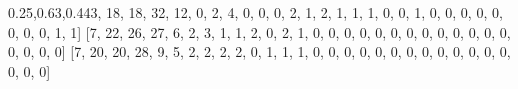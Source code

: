 \documentclass[
]{article}
\newenvironment{Shaded}{}{}
\newcommand{\DecValTok}[1]{\textcolor[rgb]{0.25,0.63,0.44}{#1}}
\newcommand{\NormalTok}[1]{#1}
\begin{document}
\begin{Shaded}
\begin{Highlighting}[]
\NormalTok{[}\DecValTok{3}\NormalTok{, }\DecValTok{18}\NormalTok{, }\DecValTok{18}\NormalTok{, }\DecValTok{32}\NormalTok{, }\DecValTok{12}\NormalTok{, }\DecValTok{0}\NormalTok{, }\DecValTok{2}\NormalTok{, }\DecValTok{4}\NormalTok{, }\DecValTok{0}\NormalTok{, }\DecValTok{0}\NormalTok{, }\DecValTok{0}\NormalTok{, }\DecValTok{2}\NormalTok{, }\DecValTok{1}\NormalTok{, }\DecValTok{2}\NormalTok{, }\DecValTok{1}\NormalTok{, }\DecValTok{1}\NormalTok{, }\DecValTok{1}\NormalTok{, }\DecValTok{0}\NormalTok{, }\DecValTok{0}\NormalTok{, }\DecValTok{1}\NormalTok{, }\DecValTok{0}\NormalTok{, }\DecValTok{0}\NormalTok{, }\DecValTok{0}\NormalTok{, }\DecValTok{0}\NormalTok{, }\DecValTok{0}\NormalTok{, }\DecValTok{0}\NormalTok{, }\DecValTok{0}\NormalTok{, }\DecValTok{0}\NormalTok{, }\DecValTok{1}\NormalTok{, }\DecValTok{1}\NormalTok{]}
\NormalTok{[}\DecValTok{7}\NormalTok{, }\DecValTok{22}\NormalTok{, }\DecValTok{26}\NormalTok{, }\DecValTok{27}\NormalTok{, }\DecValTok{6}\NormalTok{, }\DecValTok{2}\NormalTok{, }\DecValTok{3}\NormalTok{, }\DecValTok{1}\NormalTok{, }\DecValTok{1}\NormalTok{, }\DecValTok{2}\NormalTok{, }\DecValTok{0}\NormalTok{, }\DecValTok{2}\NormalTok{, }\DecValTok{1}\NormalTok{, }\DecValTok{0}\NormalTok{, }\DecValTok{0}\NormalTok{, }\DecValTok{0}\NormalTok{, }\DecValTok{0}\NormalTok{, }\DecValTok{0}\NormalTok{, }\DecValTok{0}\NormalTok{, }\DecValTok{0}\NormalTok{, }\DecValTok{0}\NormalTok{, }\DecValTok{0}\NormalTok{, }\DecValTok{0}\NormalTok{, }\DecValTok{0}\NormalTok{, }\DecValTok{0}\NormalTok{, }\DecValTok{0}\NormalTok{, }\DecValTok{0}\NormalTok{, }\DecValTok{0}\NormalTok{, }\DecValTok{0}\NormalTok{, }\DecValTok{0}\NormalTok{]}
\NormalTok{[}\DecValTok{7}\NormalTok{, }\DecValTok{20}\NormalTok{, }\DecValTok{20}\NormalTok{, }\DecValTok{28}\NormalTok{, }\DecValTok{9}\NormalTok{, }\DecValTok{5}\NormalTok{, }\DecValTok{2}\NormalTok{, }\DecValTok{2}\NormalTok{, }\DecValTok{2}\NormalTok{, }\DecValTok{2}\NormalTok{, }\DecValTok{0}\NormalTok{, }\DecValTok{1}\NormalTok{, }\DecValTok{1}\NormalTok{, }\DecValTok{1}\NormalTok{, }\DecValTok{0}\NormalTok{, }\DecValTok{0}\NormalTok{, }\DecValTok{0}\NormalTok{, }\DecValTok{0}\NormalTok{, }\DecValTok{0}\NormalTok{, }\DecValTok{0}\NormalTok{, }\DecValTok{0}\NormalTok{, }\DecValTok{0}\NormalTok{, }\DecValTok{0}\NormalTok{, }\DecValTok{0}\NormalTok{, }\DecValTok{0}\NormalTok{, }\DecValTok{0}\NormalTok{, }\DecValTok{0}\NormalTok{, }\DecValTok{0}\NormalTok{, }\DecValTok{0}\NormalTok{, }\DecValTok{0}\NormalTok{]}
\end{Highlighting}
\end{Shaded}
\end{document}
